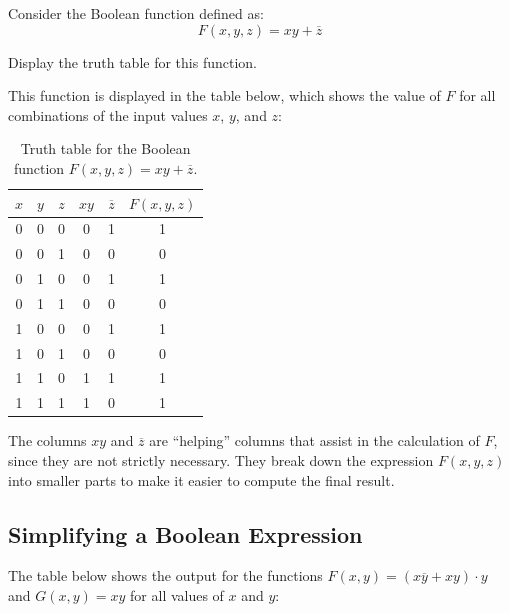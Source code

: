 \begin{example}Consider the Boolean function defined as:
    \[
F(x, y, z) = xy + \overline{z}
\]

Display the truth table for this function.

\begin{solution} This function is displayed in the table below, which shows the value of \( F \) for all combinations of the input values \( x \), \( y \), and \( z \):

\begin{table}[h!]
\begin{center}
\renewcommand{\arraystretch}{1.5} %
\begin{tabular}{c|c|c|c|c|c}

$x$ & $y$ & $z$ & $xy$ & $\overline{z}$ & $F(x, y, z)$ \\
\hline
0 & 0 & 0 & 0 & 1 & 1 \\
\rowcolor{gray!20}
0 & 0 & 1 & 0 & 0 & 0 \\
0 & 1 & 0 & 0 & 1 & 1 \\
\rowcolor{gray!20}
0 & 1 & 1 & 0 & 0 & 0 \\
1 & 0 & 0 & 0 & 1 & 1 \\
\rowcolor{gray!20}
1 & 0 & 1 & 0 & 0 & 0 \\
1 & 1 & 0 & 1 & 1 & 1 \\
\rowcolor{gray!20}
1 & 1 & 1 & 1 & 0 & 1 \\
\end{tabular}
\end{center}
\caption{Truth table for the Boolean function \( F(x, y, z) = xy + \overline{z} \).}
\label{tab:boolean_example}
\end{table}

The columns \( xy \) and \( \overline{z} \) are “helping” columns that assist in the calculation of \( F \), since they are not strictly necessary. They break down the expression \( F(x, y, z) \) into smaller parts to make it easier to compute the final result.
    
\end{solution}
\end{example}

\subsection*{Simplifying a Boolean Expression}

The table below shows the output for the functions \( F(x, y) = (x\overline{y} + xy) \cdot y \) and \( G(x, y) = xy \) for all values of \( x \) and \( y \):

